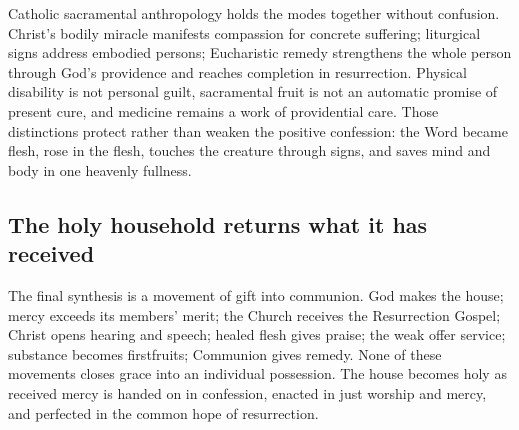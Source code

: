 Catholic sacramental anthropology holds the modes together without confusion.
Christ's bodily miracle manifests compassion for concrete suffering;
liturgical signs address embodied persons; Eucharistic remedy strengthens the
whole person through God's providence and reaches completion in resurrection.
Physical disability is not personal guilt, sacramental fruit is not an
automatic promise of present cure, and medicine remains a work of providential
care. Those distinctions protect rather than weaken the positive confession:
the Word became flesh, rose in the flesh, touches the creature through signs,
and saves mind and body in one heavenly fullness.

\subsection*{The holy household returns what it has received}

The final synthesis is a movement of gift into communion. God makes the house;
mercy exceeds its members' merit; the Church receives the Resurrection Gospel;
Christ opens hearing and speech; healed flesh gives praise; the weak offer
service; substance becomes firstfruits; Communion gives remedy. None of these
movements closes grace into an individual possession. The house becomes holy
as received mercy is handed on in confession, enacted in just worship and
mercy, and perfected in the common hope of resurrection.
